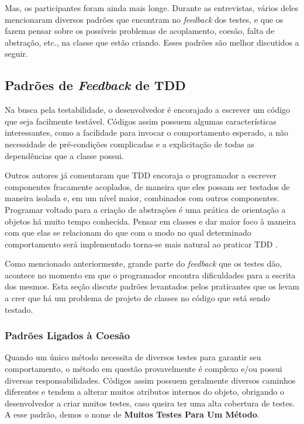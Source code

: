 \documentclass[conference]{IEEEtran}
\begin{document}
Mas, os participantes foram ainda mais longe. Durante as entrevistas,
vários deles mencionaram diversos padrões que encontram no \textit{feedback} dos testes,
e que os fazem pensar sobre os possíveis problemas de acoplamento,
coesão, falta de abstração, etc., na classe que estão criando.
Esses padrões são melhor discutidos a seguir.

\subsection{Padrões de \textit{Feedback} de TDD}
\label{padroes-tdd}

Na busca pela testabilidade, o desenvolvedor é encorajado a escrever um
código que seja facilmente testável. Códigos assim possuem algumas
características interessantes, como a facilidade para invocar o comportamento
esperado, a não necessidade de pré-condições complicadas e a explicitação de
todas as dependências que a classe possui.

Outros autores já comentaram que 
TDD encoraja o programador a escrever componentes fracamente acoplados, de
maneira que eles possam ser testados de maneira isolada e, em um nível maior,
combinados com outros componentes.
Programar voltado para a criação de abstrações é uma prática de orientação a objetos há muito
tempo conhecida. Pensar em classes e dar maior foco à maneira com que
elas se relacionam do que com o modo no qual determinado comportamento será implementado
torna-se mais natural ao praticar TDD \cite{GOOS}. 

Como mencionado anteriormente, grande parte do \textit{feedback} que os testes
dão, acontece no momento em que o programador encontra dificuldades para a
escrita dos mesmos. Esta seção discute padrões levantados pelos praticantes
que os levam a crer que há um problema de projeto de classes no código
que está sendo testado.

\subsubsection{Padrões Ligados à Coesão}

Quando um único método necessita de diversos testes para garantir seu comportamento,
o método em questão provavelmente é complexo e/ou possui diversas responsabilidades.
Códigos assim possuem geralmente diversos caminhos
diferentes e tendem a alterar muitos atributos internos do objeto, obrigando o desenvolvedor
a criar muitos testes, caso queira ter uma alta cobertura de testes.
A esse padrão, demos o nome de \textbf{Muitos Testes Para Um Método}.
\end{document}
